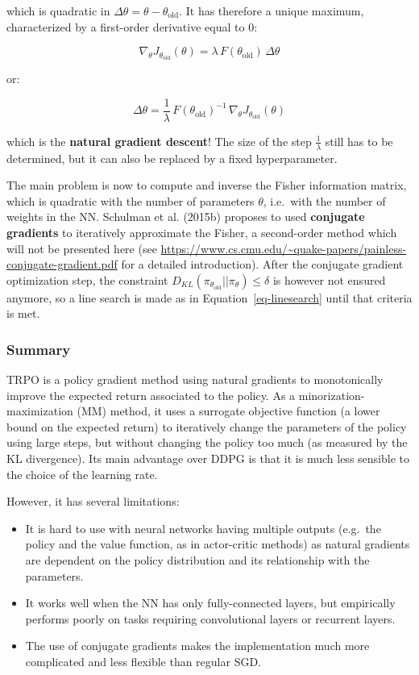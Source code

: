 \documentclass[
  letterpaper,
  DIV=11,
  numbers=noendperiod]{scrreprt}
\providecommand{\tightlist}{%
  \setlength{\itemsep}{0pt}\setlength{\parskip}{0pt}}\usepackage{longtable,booktabs,array}
\begin{document}
which is quadratic in \(\Delta \theta = \theta- \theta_\text{old}\). It
has therefore a unique maximum, characterized by a first-order
derivative equal to 0:

\[
    \nabla_\theta J_{\theta_\text{old}}(\theta) = \lambda \, F(\theta_\text{old}) \,  \Delta \theta
\]

or:

\[
    \Delta \theta  = \frac{1}{\lambda} \, F(\theta_\text{old})^{-1} \,  \nabla_\theta J_{\theta_\text{old}}(\theta)
\]

which is the \textbf{natural gradient descent}! The size of the step
\(\frac{1}{\lambda}\) still has to be determined, but it can also be
replaced by a fixed hyperparameter.

The main problem is now to compute and inverse the Fisher information
matrix, which is quadratic with the number of parameters \(\theta\),
i.e.~with the number of weights in the NN. Schulman et al. (2015b)
proposes to used \textbf{conjugate gradients} to iteratively approximate
the Fisher, a second-order method which will not be presented here (see
\url{https://www.cs.cmu.edu/~quake-papers/painless-conjugate-gradient.pdf}
for a detailed introduction). After the conjugate gradient optimization
step, the constraint
\(D_{KL}(\pi_{\theta_\text{old}} || \pi_\theta) \leq \delta\) is however
not ensured anymore, so a line search is made as in
Equation~\ref{eq-linesearch} until that criteria is met.

\hypertarget{summary}{%
\subsubsection*{Summary}\label{summary}}

TRPO is a policy gradient method using natural gradients to
monotonically improve the expected return associated to the policy. As a
minorization-maximization (MM) method, it uses a surrogate objective
function (a lower bound on the expected return) to iteratively change
the parameters of the policy using large steps, but without changing the
policy too much (as measured by the KL divergence). Its main advantage
over DDPG is that it is much less sensible to the choice of the learning
rate.

However, it has several limitations:

\begin{itemize}
\tightlist
\item
  It is hard to use with neural networks having multiple outputs
  (e.g.~the policy and the value function, as in actor-critic methods)
  as natural gradients are dependent on the policy distribution and its
  relationship with the parameters.
\item
  It works well when the NN has only fully-connected layers, but
  empirically performs poorly on tasks requiring convolutional layers or
  recurrent layers.
\item
  The use of conjugate gradients makes the implementation much more
  complicated and less flexible than regular SGD.
\end{itemize}
\end{document}
